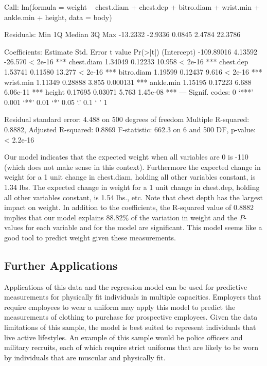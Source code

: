 \documentclass[11pt]{article}
\begin{document}
\begin{Schunk}
\begin{Soutput}
Call:
lm(formula = weight ~ chest.diam + chest.dep + bitro.diam + wrist.min + 
    ankle.min + height, data = body)

Residuals:
     Min       1Q   Median       3Q      Max 
-13.2332  -2.9336   0.0845   2.4784  22.3786 

Coefficients:
              Estimate Std. Error t value Pr(>|t|)    
(Intercept) -109.89016    4.13592 -26.570  < 2e-16 ***
chest.diam     1.34049    0.12233  10.958  < 2e-16 ***
chest.dep      1.53741    0.11580  13.277  < 2e-16 ***
bitro.diam     1.19599    0.12437   9.616  < 2e-16 ***
wrist.min      1.11349    0.28888   3.855 0.000131 ***
ankle.min      1.15195    0.17223   6.688 6.06e-11 ***
height         0.17695    0.03071   5.763 1.45e-08 ***
---
Signif. codes:  0 ‘***’ 0.001 ‘**’ 0.01 ‘*’ 0.05 ‘.’ 0.1 ‘ ’ 1

Residual standard error: 4.488 on 500 degrees of freedom
Multiple R-squared:  0.8882,	Adjusted R-squared:  0.8869 
F-statistic: 662.3 on 6 and 500 DF,  p-value: < 2.2e-16
\end{Soutput}
\end{Schunk}

Our model indicates that the expected weight when all variables are 0 is -110 (which does not make sense in this context). Furthermore the expected change in weight for a 1 unit change in chest.diam, holding all other variables constant, is 1.34 lbs. The expected change in weight for a 1 unit change in chest.dep, holding all other variables constant, is 1.54 lbs., etc. Note that chest depth has the largest impact on weight. In addition to the coefficients, the R-squared value of 0.8882 implies that our model explains 88.82\% of the variation in weight and the $P$-values for each variable and for the model are significant. This model seems like a good tool to predict weight given these measurements.


\subsection{Further Applications} %

Applications of this data and the regression model can be used for predictive measurements for physically fit individuals in multiple capacities.  Employers that require employees to wear a uniform may apply this model to predict the measurements of clothing to purchase for prospective employees.  Given the data limitations of this sample, the model is best suited to represent individuals that live active lifestyles.  An example of this sample would be police officers and military recruits, each of which require strict uniforms that are likely to be worn by individuals that are muscular and physically fit. \\
\end{document}
